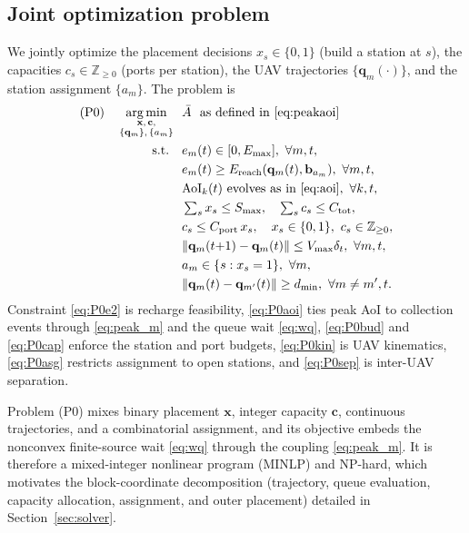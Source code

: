 \subsection{Joint optimization problem}
\label{subsec:problem}
We jointly optimize the placement decisions $x_s\in\{0,1\}$ (build a station at
$s$), the capacities $c_s\in\mathbb{Z}_{\ge0}$ (ports per station), the UAV
trajectories $\{\mathbf{q}_m(\cdot)\}$, and the station assignment
$\{a_m\}$. The problem is
\begin{subequations}\label{eq:P0}
\begin{align}
  \text{(P0)}\quad
  \argmin_{\substack{\mathbf{x},\,\mathbf{c},\\ \{\mathbf{q}_m\},\,\{a_m\}}}\ \
    & \bar{A}\ \text{ as defined in }\eqref{eq:peakaoi}
    \label{eq:P0obj}\\
  \text{s.t.}\quad
    & e_m(t)\in[0,E_{\max}],\ \forall m,t,
    \label{eq:P0e1}\\
    & e_m(t)\ge E_{\mathrm{reach}}(\mathbf{q}_m(t),\mathbf{b}_{a_m}),\ \forall m,t,
    \label{eq:P0e2}\\
    & \Aoi_k(t)\ \text{evolves as in \eqref{eq:aoi}},\ \forall k,t,
    \label{eq:P0aoi}\\
    & \textstyle\sum\nolimits_{s} x_s \le S_{\max},\quad
      \sum\nolimits_{s} c_s \le C_{\mathrm{tot}},
    \label{eq:P0bud}\\
    & c_s \le C_{\mathrm{port}}\,x_s,\quad
      x_s\in\{0,1\},\ c_s\in\mathbb{Z}_{\ge0},
    \label{eq:P0cap}\\
    & \|\mathbf{q}_m(t{+}1)-\mathbf{q}_m(t)\|\le V_{\max}\delta_t,\ \forall m,t,
    \label{eq:P0kin}\\
    & a_m\in\{s:x_s=1\},\ \forall m,
    \label{eq:P0asg}\\
    & \|\mathbf{q}_m(t)-\mathbf{q}_{m'}(t)\|\ge d_{\min},\ \forall m\ne m',t.
    \label{eq:P0sep}
\end{align}
\end{subequations}
Constraint \eqref{eq:P0e2} is recharge feasibility, \eqref{eq:P0aoi} ties peak
AoI to collection events through \eqref{eq:peak_m} and the queue wait
\eqref{eq:wq}, \eqref{eq:P0bud} and \eqref{eq:P0cap} enforce the station and port
budgets, \eqref{eq:P0kin} is UAV kinematics, \eqref{eq:P0asg} restricts
assignment to open stations, and \eqref{eq:P0sep} is inter-UAV separation.

Problem (P0) mixes binary placement $\mathbf{x}$, integer capacity $\mathbf{c}$,
continuous trajectories, and a combinatorial assignment, and its objective embeds
the nonconvex finite-source wait \eqref{eq:wq} through the coupling
\eqref{eq:peak_m}. It is therefore a mixed-integer nonlinear program (MINLP) and
NP-hard, which motivates the block-coordinate decomposition (trajectory, queue
evaluation, capacity allocation, assignment, and outer placement) detailed in
Section~\ref{sec:solver}.
